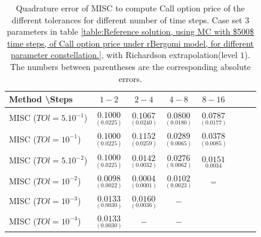 \documentclass[11pt]{article}
\begin{document}
\begin{table}[h!]
\centering
\begin{tabular}{l*{6}{c}r}
Method \textbackslash  Steps            & $1-2$ & $2-4$ & $4-8$ & $8-16$  \\
\hline
MISC ($TOl=5.10^{-1}$)  & $\underset{(     0.0225)}{\mathbf{  0.1000}}$ & $\underset{( 0.0240)}{\mathbf{       0.1067
}}$ & $\underset{(0.0180)}{\mathbf{  0.0800}}$ & $\underset{(     0.0177
	)}{\mathbf{    0.0787
}}$ \\
MISC ($TOl=10^{-1}$)  & $\underset{(     0.0225)}{\mathbf{  0.1000}}$& $\underset{(    0.0259
	)}{\mathbf{       0.1152}}$ & $\underset{( 0.0065)}{\mathbf{
		0.0289
}}$ & $\underset{(   0.0085)}{\mathbf{  0.0378}}$  \\
MISC ($TOl=5.10^{-2}$)  & $\underset{(     0.0225)}{\mathbf{  0.1000}}$& $\underset{( 0.0032)}{\mathbf{    0.0142}}$ & $\underset{( 0.0062)}{\mathbf{
		0.0276}}$ & $\underset{    0.0034}{\mathbf{
		0.0151}}$ \\
MISC ($TOl=10^{-2}$)  & $\underset{ (    0.0022)}{\mathbf{  0.0098
}}$ & $\underset{(0.0001)}{\mathbf{0.0004}}$ & $\underset{(
	0.0023)}{\mathbf{
		0.0102
}}$ & $\underset{-}{\mathbf{-}}$  \\
MISC ($TOl=10^{-3}$)  & $\underset{ (0.0030
	)}{\mathbf{0.0133
}}$ &      $\underset{ (    0.0036
	)}{\mathbf{     0.0160}}$
& $-$&\\
MISC ($TOl=10^{-4}$)  & $\underset{ (0.0030
	)}{\mathbf{0.0133
}}$ &$-$&$-$&\\
\hline
\end{tabular}
\caption{Quadrature error of MISC to compute Call option price of the different tolerances for different number of time steps. Case set $3$ parameters in table \ref{table:Reference solution, using MC with $500$ time steps, of Call option price under rBergomi model, for different parameter constellation.}, with Richardson extrapolation(level $1$). The numbers between parentheses are the corresponding absolute errors.}
\label{Quadrature error of MISC to compute Call option price of the different tolerances for different number of time steps. Case set $3$ parameters, with Richardson extrapolation(level $1$). The numbers between parentheses are the corresponding absolute errors,linear}
\end{table}
\end{document}
